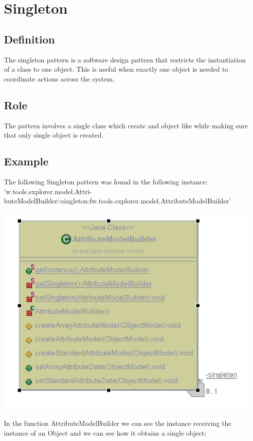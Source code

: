 \section{Singleton}

\subsection{Definition}
The singleton pattern is a software design pattern that restricts the instantiation of a class to one object. This is useful when exactly one object is needed to coordinate actions across the system.
\subsection{Role}
The pattern involves a single class which create and object like while making sure that only single object is created.
\subsection{Example}

The following Singleton pattern was found in the following instance: 'w.tools.explorer.model.Attri-
buteModelBuilder::singleton:fw.tools.explorer.model.AttributeModelBuilder'

\begin{center}
\includegraphics{Singleton}
\end{center}



In the function AttributeModelBuilder we can see the instance receiving the instance of an Object and we can see how it obtains a single object:

